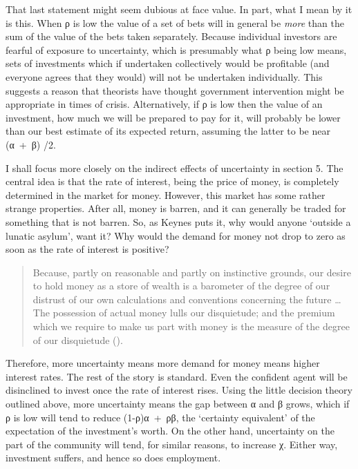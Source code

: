 \documentclass[
  11pt,
  letterpaper,
  DIV=11,
  numbers=noendperiod,
  twoside]{scrartcl}
\begin{document}
That last statement might seem dubious at face value. In part, what I
mean by it is this. When ρ is low the value of a set of bets will in
general be \emph{more} than the sum of the value of the bets taken
separately. Because individual investors are fearful of exposure to
uncertainty, which is presumably what ρ being low means, sets of
investments which if undertaken collectively would be profitable (and
everyone agrees that they would) will not be undertaken individually.
This suggests a reason that theorists have thought government
intervention might be appropriate in times of crisis. Alternatively, if
ρ is low then the value of an investment, how much we will be prepared
to pay for it, will probably be lower than our best estimate of its
expected return, assuming the latter to be near (α~+~β) /2.

I shall focus more closely on the indirect effects of uncertainty in
section 5. The central idea is that the rate of interest, being the
price of money, is completely determined in the market for money.
However, this market has some rather strange properties. After all,
money is barren, and it can generally be traded for something that is
not barren. So, as Keynes puts it, why would anyone `outside a lunatic
asylum', want it? Why would the demand for money not drop to zero as
soon as the rate of interest is positive?

\begin{quote}
Because, partly on reasonable and partly on instinctive grounds, our
desire to hold money as a store of wealth is a barometer of the degree
of our distrust of our own calculations and conventions concerning the
future \ldots{} The possession of actual money lulls our disquietude;
and the premium which we require to make us part with money is the
measure of the degree of our disquietude
().
\end{quote}

Therefore, more uncertainty means more demand for money means higher
interest rates. The rest of the story is standard. Even the confident
agent will be disinclined to invest once the rate of interest rises.
Using the little decision theory outlined above, more uncertainty means
the gap between α and β grows, which if ρ is low will tend to reduce
(1-ρ)α~+~ρβ, the `certainty equivalent' of the expectation of the
investment's worth. On the other hand, uncertainty on the part of the
community will tend, for similar reasons, to increase χ. Either way,
investment suffers, and hence so does employment.
\end{document}
